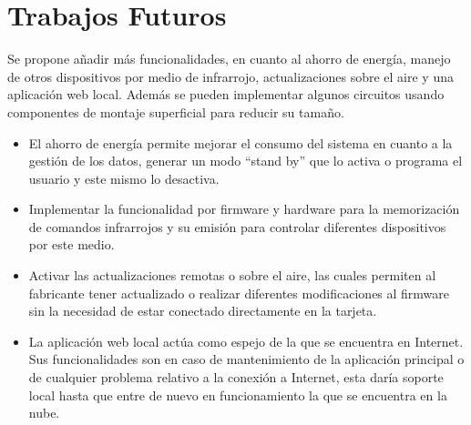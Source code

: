 \chapter{Trabajos Futuros}

Se propone añadir más funcionalidades, en cuanto al ahorro de energía, manejo de otros dispositivos por medio de infrarrojo, actualizaciones sobre el aire y una aplicación web local. Además se pueden implementar algunos circuitos usando componentes de montaje superficial para reducir su tamaño.

\begin{itemize}
	\item El ahorro de energía permite mejorar el consumo del sistema en cuanto a la gestión de los datos, generar un modo ``stand by'' que lo activa o programa el usuario y este mismo lo desactiva.
	\item Implementar la funcionalidad por firmware y hardware para la memorización de comandos infrarrojos y su emisión para controlar diferentes dispositivos por este medio.
	\item Activar las actualizaciones remotas o sobre el aire, las cuales permiten al fabricante tener actualizado o realizar diferentes modificaciones al firmware sin la necesidad de estar conectado directamente en la tarjeta.
	\item La aplicación web local actúa como espejo de la que se encuentra en Internet. Sus funcionalidades son en caso de mantenimiento de la aplicación principal o de cualquier problema relativo a la conexión a Internet, esta daría soporte local hasta que entre de nuevo en funcionamiento la que se encuentra en la nube.
\end{itemize}